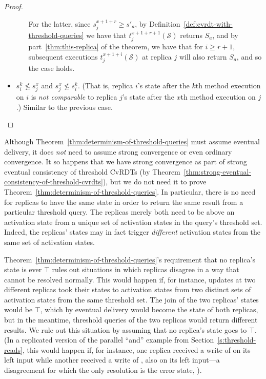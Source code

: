 \begin{proof}
\begin{itemize}
\begin{itemize}
For the latter, since $s^{x+1+r}_j \geq s'_a$, by
Definition~\ref{def:cvrdt-with-threshold-queries} we have that
$t^{x+1+r+1}_j(\mathcal{S})$ returns $S_a$, and by
part~\ref{thm:this-replica} of the theorem, we have that for $i \geq
r+1$, subsequent executions $t^{x+1+i}_j(\mathcal{S})$ at replica $j$
will also return $S_a$, and so the case holds.
\end{itemize}

\item $s^k_i \nleq s^x_j$ and $s^x_j \nleq s^k_i$.
(That is, replica $i$'s state after the $k$th method execution on $i$
is \emph{not comparable} to replica $j$'s state after the $x$th method
execution on $j$.)  Similar to the previous case.
\end{itemize}
\end{proof}

Although Theorem~\ref{thm:determinism-of-threshold-queries} must
assume eventual delivery, it does \emph{not} need to assume strong
convergence or even ordinary convergence.  It so happens that we have
strong convergence as part of strong eventual consistency of threshold
CvRDTs (by
Theorem~\ref{thm:strong-eventual-consistency-of-threshold-cvrdts}),
but we do not need it to prove
Theorem~\ref{thm:determinism-of-threshold-queries}.  In particular,
there is no need for replicas to have the same state in order to
return the same result from a particular threshold query.  The
replicas merely both need to be above an activation state from a
unique set of activation states in the query's threshold set.  Indeed,
the replicas' states may in fact trigger \emph{different} activation
states from the same set of activation states.

Theorem~\ref{thm:determinism-of-threshold-queries}'s requirement that
no replica's state is ever $\top$ rules out situations in which
replicas disagree in a way that cannot be resolved normally.  This
would happen if, for instance, updates at two different replicas took
their states to activation states from two distinct sets of activation
states from the same threshold set.  The join of the two replicas'
states would be $\top$, which by eventual delivery would become the
state of both replicas, but in the meantime, threshold queries of the
two replicas would return different results.  We rule out this
situation by assuming that no replica's state goes to $\top$.  (In a
replicated version of the parallel ``and'' example from
Section~\ref{s:threshold-reads}, this would happen if, for instance,
one replica received a write of  on its left input while another
received a write of , also on its left input---a disagreement
for which the only resolution is the error state, ).
